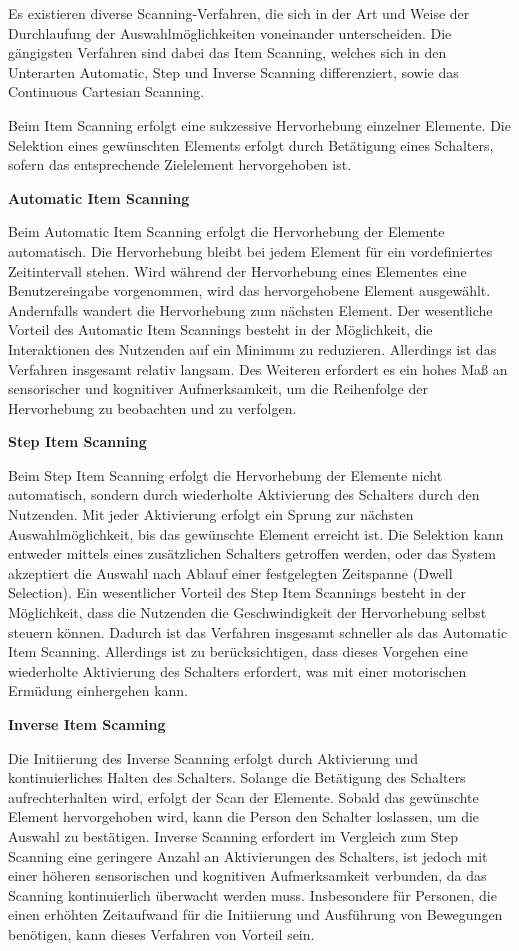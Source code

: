 Es existieren diverse Scanning-Verfahren, die sich in der Art und Weise der Durchlaufung der Auswahlmöglichkeiten voneinander unterscheiden. Die gängigsten Verfahren sind dabei das Item Scanning, welches sich in den Unterarten Automatic, Step und Inverse Scanning differenziert, sowie das Continuous Cartesian Scanning.

Beim Item Scanning erfolgt eine sukzessive Hervorhebung einzelner Elemente. Die Selektion eines gewünschten Elements erfolgt durch Betätigung eines Schalters, sofern das entsprechende Zielelement hervorgehoben ist. 

{\normalfont \bfseries Automatic Item Scanning} 

Beim Automatic Item Scanning erfolgt die Hervorhebung der Elemente automatisch. Die Hervorhebung bleibt bei jedem Element für ein vordefiniertes Zeitintervall stehen. Wird während der Hervorhebung eines Elementes eine Benutzereingabe vorgenommen, wird das hervorgehobene Element ausgewählt. Andernfalls wandert die Hervorhebung zum nächsten Element.
Der wesentliche Vorteil des Automatic Item Scannings besteht in der Möglichkeit, die Interaktionen des Nutzenden auf ein Minimum zu reduzieren. Allerdings ist das Verfahren insgesamt relativ langsam. Des Weiteren erfordert es ein hohes Maß an sensorischer und kognitiver Aufmerksamkeit, um die Reihenfolge der Hervorhebung zu beobachten und zu verfolgen.

{\normalfont \bfseries Step Item Scanning} 

Beim Step Item Scanning erfolgt die Hervorhebung der Elemente nicht automatisch, sondern durch wiederholte Aktivierung des Schalters durch den Nutzenden. Mit jeder Aktivierung erfolgt ein Sprung zur nächsten Auswahlmöglichkeit, bis das gewünschte Element erreicht ist. Die Selektion kann entweder mittels eines zusätzlichen Schalters getroffen werden, oder das System akzeptiert die Auswahl nach Ablauf einer festgelegten Zeitspanne (Dwell Selection). Ein wesentlicher Vorteil des Step Item Scannings besteht in der Möglichkeit, dass die Nutzenden die Geschwindigkeit der Hervorhebung selbst steuern können. Dadurch ist das Verfahren insgesamt schneller als das Automatic Item Scanning.  Allerdings ist zu berücksichtigen, dass dieses Vorgehen eine wiederholte Aktivierung des Schalters erfordert, was mit einer motorischen Ermüdung einhergehen kann.

{\normalfont \bfseries Inverse Item Scanning} 

Die Initiierung des Inverse Scanning erfolgt durch Aktivierung und kontinuierliches Halten des Schalters. Solange die Betätigung des Schalters aufrechterhalten wird, erfolgt der Scan der Elemente. Sobald das gewünschte Element hervorgehoben wird, kann die Person den Schalter loslassen, um die Auswahl zu bestätigen. Inverse Scanning erfordert im Vergleich zum Step Scanning eine geringere Anzahl an Aktivierungen des Schalters, ist jedoch mit einer höheren sensorischen und kognitiven Aufmerksamkeit verbunden, da das Scanning kontinuierlich überwacht werden muss. Insbesondere für Personen, die einen erhöhten Zeitaufwand für die Initiierung und Ausführung von Bewegungen benötigen, kann dieses Verfahren von Vorteil sein. 

